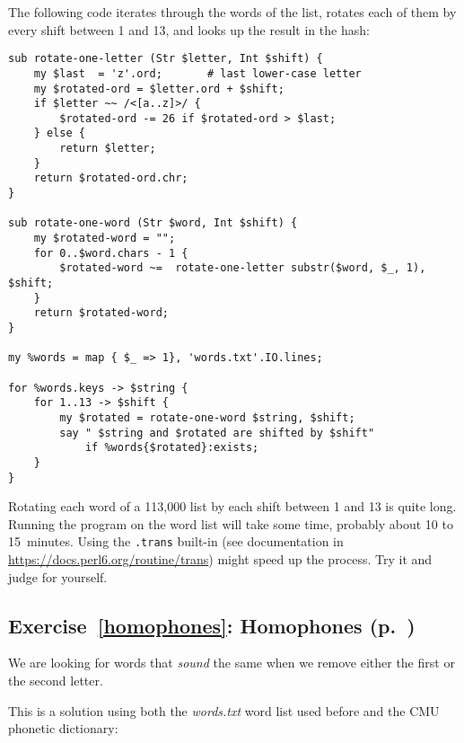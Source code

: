 The following code iterates through the words of the list, 
rotates each of them by every shift between 1 and 13, and 
looks up the result in the hash:

\begin{verbatim}
sub rotate-one-letter (Str $letter, Int $shift) {
    my $last  = 'z'.ord;       # last lower-case letter
    my $rotated-ord = $letter.ord + $shift;
    if $letter ~~ /<[a..z]>/ { 
        $rotated-ord -= 26 if $rotated-ord > $last;
    } else {
        return $letter;
    }
    return $rotated-ord.chr;
}

sub rotate-one-word (Str $word, Int $shift) {
    my $rotated-word = "";
    for 0..$word.chars - 1 {
        $rotated-word ~=  rotate-one-letter substr($word, $_, 1), $shift;
    }
    return $rotated-word;
}

my %words = map { $_ => 1}, 'words.txt'.IO.lines;

for %words.keys -> $string {
    for 1..13 -> $shift {
        my $rotated = rotate-one-word $string, $shift;
        say " $string and $rotated are shifted by $shift"
            if %words{$rotated}:exists;
    }
}
\end{verbatim}

Rotating each word of a 113,000 list by each shift between 
1 and 13 is quite long. Running the program on the word list 
will take some time, probably about 10 to 15~minutes.
Using the \verb'.trans' built-in (see documentation in 
\url{https://docs.perl6.org/routine/trans}) might speed up 
the process. Try it and judge for yourself.

\subsection{Exercise~\ref{homophones}: Homophones (p.~\pageref{homophones})}
\label{sol_homophones}

We are looking for words that \emph{sound} the same 
when we remove either the first or the second letter.

This is a solution using both the \emph{words.txt} word list 
used before and the CMU phonetic dictionary:

